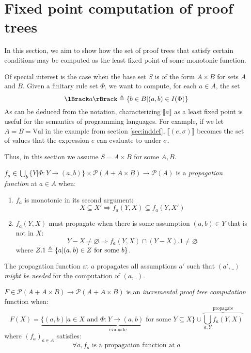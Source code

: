 \documentclass[12pt]{article}
\begin{document}
\section{Fixed point computation of proof trees}
In this section, we aim to show how the set of proof trees that satisfy certain conditions may be computed as the least fixed point of some monotonic function.

Of special interest is the case when the base set $S$ is of the form $A\times B$ for sets $A$ and $B$.
Given a finitary rule set $\Phi$, we want to compute, for each $a\in A$, the set
\[\lBrack a\rBrack\defeq\{b\in B|(a,b)\in I(\Phi)\}\]
As can be deduced from the notation, characterizing $\lBrack a\rBrack$ as a least fixed point is useful for the semantics of programming languages.
For example, if we let $A=B=\text{Val}$ in the example from section \ref{sec:inddef}, $\lBrack (e,\sigma)\rBrack$ becomes the set of values that the expression $e$ can evaluate to under $\sigma$.

Thus, in this section we assume $S=A\times B$ for some $A,B$.
\begin{definition}\label{def:propagation}
	$f_a\in\bigcup_b\{Y|\Phi:Y\rightarrow(a,b)\}\times\mathcal{P}(A+A\times B)\rightarrow\mathcal{P}(A)$ is a \emph{propagation function} at $a\in A$ when:
	\begin{enumerate}
		\item $f_a$ is monotonic in its second argument:
		      \[X\subseteq X'\Rightarrow f_a(Y,X)\subseteq f_a(Y,X')\]
		\item $f_a(Y,X)$ must propagate when there is some assumption $(a,b)\in Y$ that is not in $X$:
		      \[Y-X\neq\varnothing\Rightarrow f_a(Y,X)\cap(Y-X).1\neq\varnothing\]
		      where $Z.1\triangleq\{a|(a,b)\in Z\text{ for some }b\}$.
	\end{enumerate}
\end{definition}

The propagation function at $a$ propagates all assumptions $a'$ such that $(a',\_)$ \emph{might be needed} for the computation of $(a,\_)$.

\begin{definition}
	$F\in\mathcal{P}(A+A\times B)\rightarrow\mathcal{P}(A+A\times B)$ is an \emph{incremental proof tree computation} function when:
	\[F(X)=\underbrace{\{(a,b)|a\in X\text{ and }\Phi:Y\rightarrow(a,b)\text{ for some }Y\subseteq X\}}_{\text{evaluate}}\cup\overbrace{\bigcup_{a,Y}f_a(Y,X)}^{\text{propagate}}\]
	where $(f_a)_{a\in A}$ satisfies:
	\[\forall a,f_a\text{ is a propagation function at }a\]
\end{definition}
\end{document}
